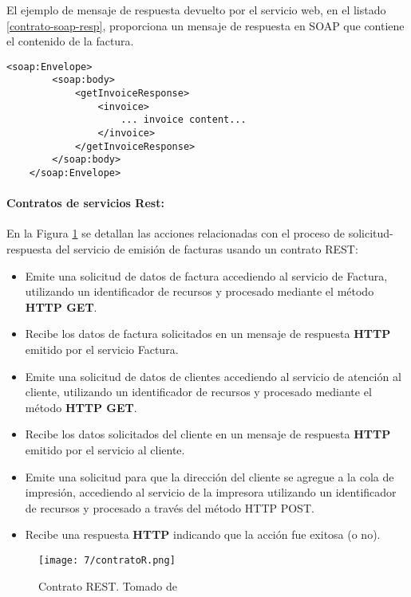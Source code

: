    
   	El ejemplo de  mensaje de respuesta devuelto por el servicio web, en el listado \ref{contrato-soap-resp},  proporciona un mensaje de respuesta en SOAP que contiene el contenido de la factura.
  
   
   
   \begin{lstlisting}[label=contrato-soap-resp, title= Respuesta en contrato de servicio SOAP]
   	<soap:Envelope>
  	 	<soap:body>   	 
  		 	<getInvoiceResponse>
  			 	<invoice> 
  			 		... invoice content...
   				</invoice>
   			</getInvoiceResponse>
   		</soap:body>
   	</soap:Envelope>
   \end{lstlisting}
   
  	\paragraph{Contratos de servicios Rest:}
    En la Figura \ref{fig:rest-contrato} se detallan las   acciones relacionadas con el proceso de solicitud-respuesta del servicio de emisi\'on de facturas usando un contrato REST:
    
    	\begin{itemize}  			
    		\item Emite una solicitud de datos de factura accediendo al servicio de Factura, utilizando un identificador de recursos y procesado mediante el método \textbf{HTTP GET}.
    		\item Recibe los datos de factura solicitados en un mensaje de respuesta \textbf{HTTP} emitido por el servicio Factura.
    		
    		\item Emite una solicitud de datos de clientes accediendo al servicio de atención al cliente, utilizando un identificador de recursos y procesado mediante el método \textbf{HTTP GET}.
    		\item Recibe los datos solicitados del cliente en un mensaje de respuesta \textbf{HTTP} emitido por el servicio al cliente.
    		\item Emite una solicitud para que la dirección del cliente se agregue a la cola de impresión, accediendo al servicio de la impresora utilizando un identificador de recursos y procesado a través del método HTTP POST.
    		\item Recibe una respuesta \textbf{HTTP} indicando que la acción fue exitosa (o no).	
    	\end{itemize}
    
    
    \begin{figure}%
    		\centering
    	\texttt{[image: 7/contratoR.png]} 
    	\caption{Contrato REST. Tomado de \cite{Erl2007}}
    	\label{fig:rest-contrato}
    \end{figure}
     
